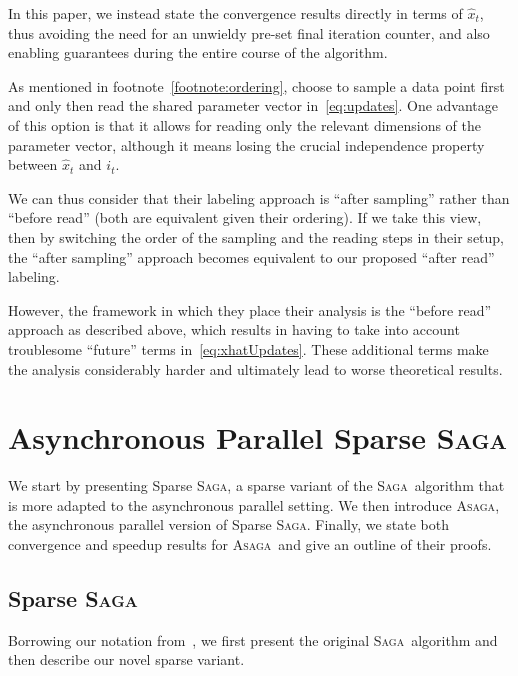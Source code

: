 \documentclass[twoside, 11pt]{article}
\newcommand{\ASAGA}{\textsc{Asaga}}
\newcommand{\SAGA}{\textsc{Saga}}
\begin{document}
In this paper, we instead state the convergence results directly in terms of $\hat x_t$, thus avoiding the need for an unwieldy pre-set final iteration counter, and also enabling guarantees during the entire course of the algorithm.

\begin{remark}
	As mentioned in footnote~\ref{footnote:ordering}, \citet{mania} choose to sample a data point first and only then read the shared parameter vector in~\eqref{eq:updates}.
	One advantage of this option is that it allows for reading only the relevant dimensions of the parameter vector, although it means losing the crucial independence property between $\hat x_t$ and $i_t$.

	We can thus consider that their labeling approach is ``after sampling'' rather than ``before read'' (both are equivalent given their ordering).
	If we take this view, then by switching the order of the sampling and the reading steps in their setup, the ``after sampling'' approach becomes equivalent to our proposed ``after read'' labeling.

	However, the framework in which they place their analysis is the ``before read'' approach as described above, which results in having to take into account troublesome ``future'' terms in~\eqref{eq:xhatUpdates}.
	These additional terms make the analysis considerably harder and ultimately lead to worse theoretical results.
\end{remark}

\section{Asynchronous Parallel Sparse \SAGA}
We start by presenting Sparse \SAGA, a sparse variant of the \SAGA\ algorithm that is more adapted to the asynchronous parallel setting.
We then introduce \ASAGA, the asynchronous parallel version of Sparse \SAGA.
Finally, we state both convergence and speedup results for \ASAGA\ and give an outline of their proofs.
\subsection{Sparse \SAGA}\label{scs:sparse_saga}
Borrowing our notation from~\citet{qsaga}, we first present the original \SAGA\ algorithm and then describe our novel sparse variant.
\end{document}
